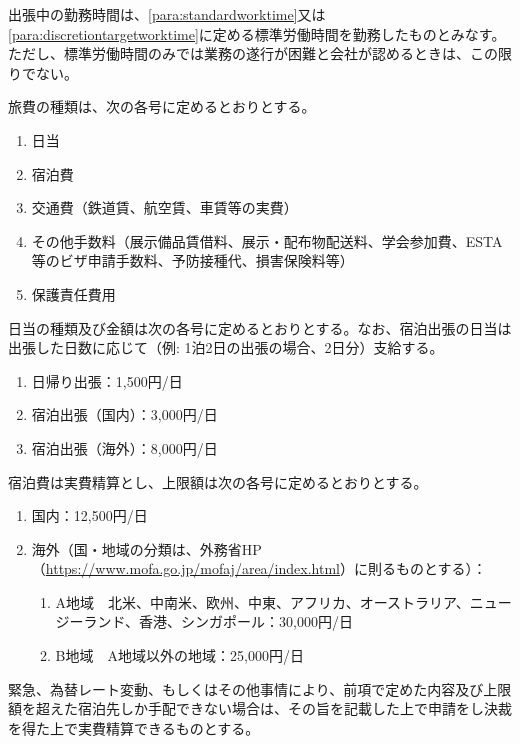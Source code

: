 \documentclass[10pt,a4paper,uplatex]{jsarticle}
\begin{document}
出張中の勤務時間は、\ref{para:standardworktime}又は\ref{para:discretiontargetworktime}に定める標準労働時間を勤務したものとみなす。ただし、標準労働時間のみでは業務の遂行が困難と会社が認めるときは、この限りでない。

旅費の種類は、次の各号に定めるとおりとする。
\begin{enumerate}
    \item 日当
    \item 宿泊費
    \item 交通費（鉄道賃、航空賃、車賃等の実費）
    \item その他手数料（展示備品賃借料、展示・配布物配送料、学会参加費、ESTA等のビザ申請手数料、予防接種代、損害保険料等）
    \item 保護責任費用
\end{enumerate}

日当の種類及び金額は次の各号に定めるとおりとする。なお、宿泊出張の日当は出張した日数に応じて（例: 1泊2日の出張の場合、2日分）支給する。
\begin{enumerate}
    \item 日帰り出張：1,500円/日
    \item 宿泊出張（国内）：3,000円/日
    \item 宿泊出張（海外）：8,000円/日
\end{enumerate}

宿泊費は実費精算とし、上限額は次の各号に定めるとおりとする。
\begin{enumerate}
    \item 国内：12,500円/日
    \item 海外（国・地域の分類は、外務省HP（\url{https://www.mofa.go.jp/mofaj/area/index.html}）に則るものとする）：
    \begin{enumerate}
        \item A地域　北米、中南米、欧州、中東、アフリカ、オーストラリア、ニュージーランド、香港、シンガポール：30,000円/日
        \item B地域　A地域以外の地域：25,000円/日
    \end{enumerate}
\end{enumerate}
\term 緊急、為替レート変動、もしくはその他事情により、前項で定めた内容及び上限額を超えた宿泊先しか手配できない場合は、その旨を記載した上で申請をし決裁を得た上で実費精算できるものとする。
\end{document}
